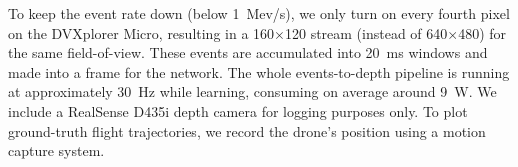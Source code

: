 To keep the event rate down (below 1~Mev/s), we only turn on every fourth pixel on the DVXplorer Micro, resulting in a 160$\times$120 stream (instead of 640$\times$480) for the same field-of-view. These events are accumulated into 20~ms windows and made into a frame for the network. The whole events-to-depth pipeline is running at approximately 30~Hz while learning, consuming on average around 9~W. We include a RealSense D435i depth camera for logging purposes only. To plot ground-truth flight trajectories, we record the drone's position using a motion capture system.
